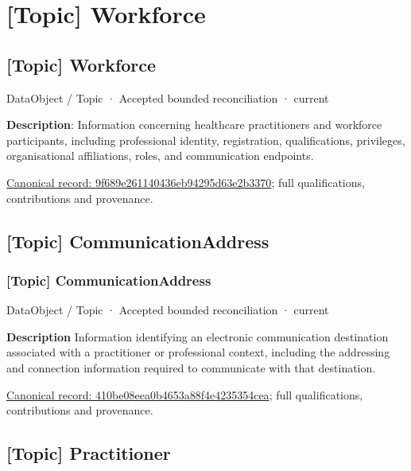 \section{[Topic] Workforce}

\subsection{[Topic] Workforce}

\label{element:9f689e261140436eb94295d63e2b3370}
{\small DataObject / Topic · Accepted bounded reconciliation · current}\par

\textbf{Description}: Information concerning healthcare practitioners and workforce participants, including professional identity, registration, qualifications, privileges, organisational affiliations, roles, and communication endpoints.


{\footnotesize \href{../../../../continuum/application/data-object/topic/9f689e261140436eb94295d63e2b3370.md}{Canonical record: 9f689e261140436eb94295d63e2b3370}; full qualifications, contributions and provenance.}\par
\subsection{[Topic] CommunicationAddress}

\subsubsection{[Topic] CommunicationAddress}

\label{element:410be08eea0b4653a88f4e4235354cea}
{\small DataObject / Topic · Accepted bounded reconciliation · current}\par

\textbf{Description}
Information identifying an electronic communication destination associated with a practitioner or professional context, including the addressing and connection information required to communicate with that destination.


{\footnotesize \href{../../../../continuum/application/data-object/topic/410be08eea0b4653a88f4e4235354cea.md}{Canonical record: 410be08eea0b4653a88f4e4235354cea}; full qualifications, contributions and provenance.}\par
\subsection{[Topic] Practitioner}

